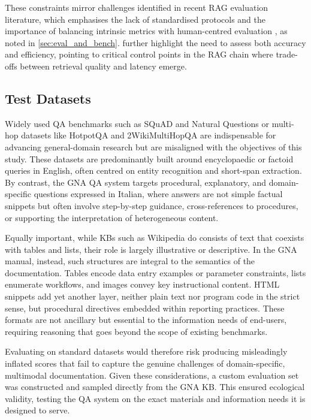 \begin{spacing}{1.5}
These constraints mirror challenges identified in recent RAG evaluation literature, which emphasises the lack of standardised protocols and the importance of balancing intrinsic metrics with human-centred evaluation \citep{abeysinghe_challenges_2024}, as noted in \autoref{sec:eval_and_bench}. \textcite{akkiraju_facts_2024} further highlight the need to assess both accuracy and efficiency, pointing to critical control points in the RAG chain where trade-offs between retrieval quality and latency emerge.


\subsection{Test Datasets}\label{sec:datasets}
Widely used QA benchmarks such as SQuAD and Natural Questions or multi-hop datasets like HotpotQA \citep{yang_hotpotqa_2018} and 2WikiMultiHopQA \citep{ho_constructing_2020} are indispensable for advancing general-domain research but are misaligned with the objectives of this study. These datasets are predominantly built around encyclopaedic or factoid queries in English, often centred on entity recognition and short-span extraction. By contrast, the GNA QA system targets procedural, explanatory, and domain-specific questions expressed in Italian, where answers are not simple factual snippets but often involve step-by-step guidance, cross-references to procedures, or supporting the interpretation of heterogeneous content.

Equally important, while KBs such as Wikipedia do consists of text that coexists with tables and lists, their role is largely illustrative or descriptive. In the GNA manual, instead, such structures are integral to the semantics of the documentation. Tables encode data entry examples or parameter constraints, lists enumerate workflows, and images convey key instructional content. HTML snippets add yet another layer, neither plain text nor program code in the strict sense, but procedural directives embedded within reporting practices. These formats are not ancillary but essential to the information needs of end-users, requiring reasoning that goes beyond the scope of existing benchmarks.

Evaluating on standard datasets would therefore risk producing misleadingly inflated scores that fail to capture the genuine challenges of domain-specific, multimodal documentation. Given these considerations, a custom evaluation set was constructed and sampled directly from the GNA KB. This ensured ecological validity, testing the QA system on the exact materials and information needs it is designed to serve.\\


\end{spacing}
